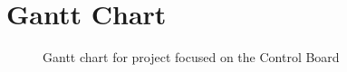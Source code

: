 \section{Gantt Chart}
\label{app:Gantts}

\begin{figure}[H]
\centering
\caption{Gantt chart for project focused on the Control Board}
\label{fig:gantt}
\end{figure}